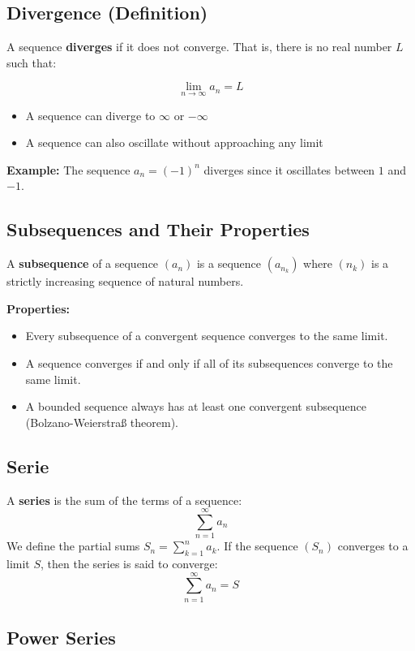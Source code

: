 \subsection{Divergence (Definition)}

A sequence \textbf{diverges} if it does not converge. That is, there is no real number \(L\) such that:

\[
\lim_{n \to \infty} a_n = L
\]

\begin{itemize}[label=\(-\)]
\item A sequence can diverge to \(\infty\) or \(-\infty\)
\item A sequence can also oscillate without approaching any limit
\end{itemize}

\textbf{Example:} The sequence \(a_n = (-1)^n\) diverges since it oscillates between \(1\) and \(-1\).


\subsection{Subsequences and Their Properties}

A \textbf{subsequence} of a sequence \((a_n)\) is a sequence \((a_{n_k})\) where \((n_k)\) is a strictly increasing sequence of natural numbers.

\textbf{Properties:}
\begin{itemize}[label=\(-\)]
\item Every subsequence of a convergent sequence converges to the same limit.
\item A sequence converges if and only if all of its subsequences converge to the same limit.
\item A bounded sequence always has at least one convergent subsequence (Bolzano-Weierstraß theorem).
\end{itemize}

\subsection{Serie}

A \textbf{series} is the sum of the terms of a sequence:
\[
\sum_{n=1}^{\infty} a_n
\]
We define the partial sums \(S_n = \sum_{k=1}^n a_k\). If the sequence \((S_n)\) converges to a limit \(S\), then the series is said to converge:
\[
\sum_{n=1}^{\infty} a_n = S
\]

\subsection{Power Series}

